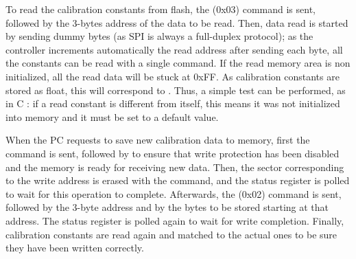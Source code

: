 To read the calibration constants from flash, the  (0x03) command is sent, followed by the 3-bytes address of the data to be read. Then, data read is started by sending dummy bytes (as SPI is always a full-duplex protocol); as the controller increments automatically the read address after sending each byte, all the constants can be read with a single command. If the read memory area is non initialized, all the read data will be stuck at 0xFF. As calibration constants are stored as float, this will correspond to . Thus, a simple test can be performed, as in C : if a read constant is different from itself, this means it was not initialized into memory and it must be set to a default value.

When the PC requests to save new calibration data to memory, first the  command is sent, followed by  to ensure that write protection has been disabled and the memory is ready for receiving new data. Then, the sector corresponding to the write address is erased with the  command, and the status register is polled to wait for this operation to complete. Afterwards, the  (0x02) command is sent, followed by the 3-byte address and by the bytes to be stored starting at that address. The status register is polled again to wait for write completion. Finally, calibration constants are read again and matched to the actual ones to be sure they have been written correctly.
